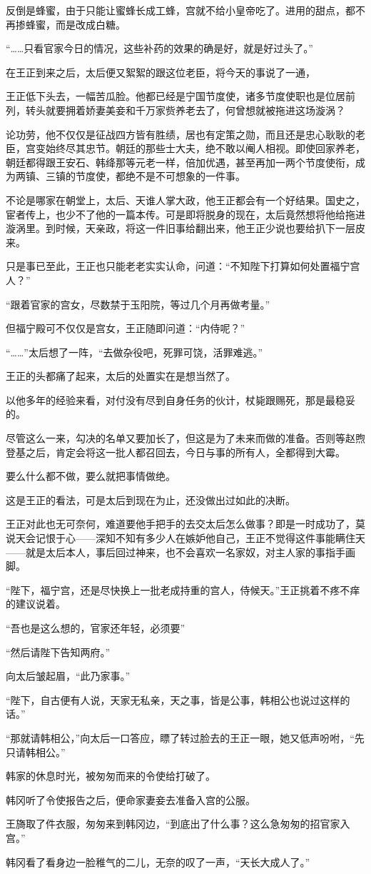 反倒是蜂蜜，由于只能让蜜蜂长成工蜂，宫就不给小皇帝吃了。进用的甜点，都不再掺蜂蜜，而是改成白糖。

“……只看官家今日的情况，这些补药的效果的确是好，就是好过头了。”

在王正到来之后，太后便又絮絮的跟这位老臣，将今天的事说了一通，

王正低下头去，一幅苦瓜脸。他都已经是宁国节度使，诸多节度使职也是位居前列，转头就要拥着娇妻美妾和千万家赀养老去了，何曾想就被拖进这场漩涡？

论功劳，他不仅仅是征战四方皆有胜绩，居也有定策之勋，而且还是忠心耿耿的老臣，宫变始终尽其忠节。朝廷的那些士大夫，绝不敢以阉人相视。即使回家养老，朝廷都得跟王安石、韩绛那等元老一样，倍加优遇，甚至再加一两个节度使衔，成为两镇、三镇的节度使，都绝不是不可想象的一件事。

不论是哪家在朝堂上，太后、天谁人掌大政，他王正都会有一个好结果。国史之，宦者传上，也少不了他的一篇本传。可是即将脱身的现在，太后竟然想将他给拖进漩涡里。到时候，天亲政，将这一件旧事给翻出来，他王正少说也要给扒下一层皮来。

只是事已至此，王正也只能老老实实认命，问道：“不知陛下打算如何处置福宁宫人？”

“跟着官家的宫女，尽数禁于玉阳院，等过几个月再做考量。”

但福宁殿可不仅仅是宫女，王正随即问道：“内侍呢？”

“……”太后想了一阵，“去做杂役吧，死罪可饶，活罪难逃。”

王正的头都痛了起来，太后的处置实在是想当然了。

以他多年的经验来看，对付没有尽到自身任务的伙计，杖毙跟赐死，那是最稳妥的。

尽管这么一来，勾决的名单又要加长了，但这是为了未来而做的准备。否则等赵煦登基之后，肯定会将这一批人都召回去，今日与事的所有人，全都得到大霉。

要么什么都不做，要么就把事情做绝。

这是王正的看法，可是太后到现在为止，还没做出过如此的决断。

王正对此也无可奈何，难道要他手把手的去交太后怎么做事？即是一时成功了，莫说天会记恨于心——深知不知有多少人在嫉妒他自己，王正不觉得这件事能瞒住天——就是太后本人，事后回过神来，也不会喜欢一名家奴，对主人家的事指手画脚。

“陛下，福宁宫，还是尽快换上一批老成持重的宫人，侍候天。”王正挑着不疼不痒的建议说着。

“吾也是这么想的，官家还年轻，必须要”

“然后请陛下告知两府。”

向太后皱起眉，“此乃家事。”

“陛下，自古便有人说，天家无私亲，天之事，皆是公事，韩相公也说过这样的话。”

“那就请韩相公，”向太后一口答应，瞟了转过脸去的王正一眼，她又低声吩咐，“先只请韩相公。”

韩家的休息时光，被匆匆而来的令使给打破了。

韩冈听了令使报告之后，便命家妻妾去准备入宫的公服。

王旖取了件衣服，匆匆来到韩冈边，“到底出了什么事？这么急匆匆的招官家入宫。”

韩冈看了看身边一脸稚气的二儿，无奈的叹了一声，“天长大成人了。”
